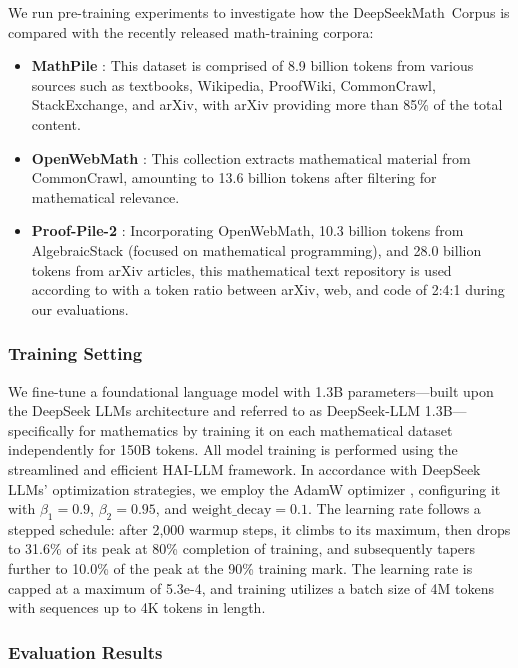 \begin{itemize}[topsep=0pt]
We run pre-training experiments to investigate how the DeepSeekMath~Corpus is compared with the recently released math-training corpora:

\begin{itemize}[topsep=0pt]
    \item \textbf{MathPile} \citep{mathpile}: This dataset is comprised of 8.9 billion tokens from various sources such as textbooks, Wikipedia, ProofWiki, CommonCrawl, StackExchange, and arXiv, with arXiv providing more than 85\% of the total content.
    \item \textbf{OpenWebMath} \citep{openwebmath}: This collection extracts mathematical material from CommonCrawl, amounting to 13.6 billion tokens after filtering for mathematical relevance.
    \item \textbf{Proof-Pile-2} \citep{llemma}: Incorporating OpenWebMath, 10.3 billion tokens from AlgebraicStack (focused on mathematical programming), and 28.0 billion tokens from arXiv articles, this mathematical text repository is used according to \cite{llemma} with a token ratio between arXiv, web, and code of 2:4:1 during our evaluations.
\end{itemize}

\subsubsection{Training Setting}
\label{sec:quality-policy}
We fine-tune a foundational language model with 1.3B parameters—built upon the DeepSeek LLMs architecture \citep{deepseek-llm} and referred to as DeepSeek-LLM 1.3B—specifically for mathematics by training it on each mathematical dataset independently for 150B tokens. All model training is performed using the streamlined and efficient HAI-LLM \citep{haillm} framework. In accordance with DeepSeek LLMs' optimization strategies, we employ the AdamW optimizer \citep{adamW}, configuring it with $\beta_1=0.9$, $\beta_2=0.95$, and $\mathrm{weight\_decay}=0.1$. The learning rate follows a stepped schedule: after 2,000 warmup steps, it climbs to its maximum, then drops to 31.6\% of its peak at 80\% completion of training, and subsequently tapers further to 10.0\% of the peak at the 90\% training mark. The learning rate is capped at a maximum of 5.3e-4, and training utilizes a batch size of 4M tokens with sequences up to 4K tokens in length.

\subsubsection{Evaluation Results}


\end{itemize}
